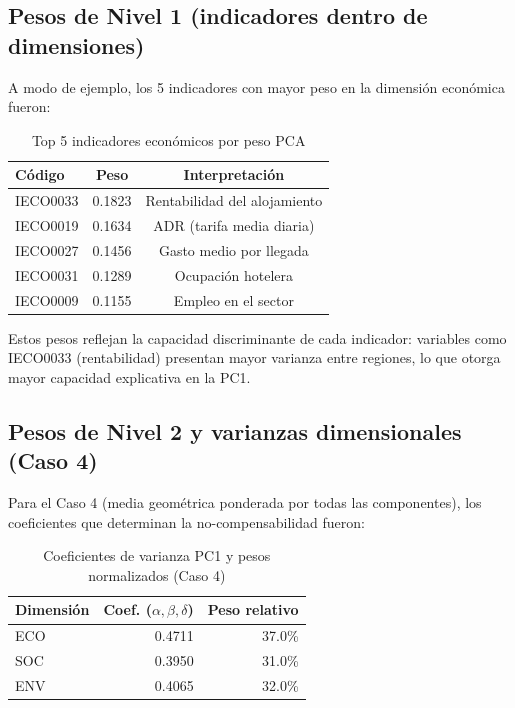 \subsection{Pesos de Nivel 1 (indicadores dentro de dimensiones)}

A modo de ejemplo, los 5 indicadores con mayor peso en la dimensión económica fueron:

\begin{table}[H]
    \centering
    \small
    \begin{tabular}{lcc}
        \toprule
        \textbf{Código} & \textbf{Peso} & \textbf{Interpretación} \\
        \midrule
        IECO0033 & 0.1823 & Rentabilidad del alojamiento \\
        IECO0019 & 0.1634 & ADR (tarifa media diaria) \\
        IECO0027 & 0.1456 & Gasto medio por llegada \\
        IECO0031 & 0.1289 & Ocupación hotelera \\
        IECO0009 & 0.1155 & Empleo en el sector \\
        \bottomrule
    \end{tabular}
    \caption{Top 5 indicadores económicos por peso PCA}
    \label{tab:pesos_eco}
\end{table}

Estos pesos reflejan la capacidad discriminante de cada indicador: variables como IECO0033 (rentabilidad) presentan mayor varianza entre regiones, lo que otorga mayor capacidad explicativa en la PC1.

\subsection{Pesos de Nivel 2 y varianzas dimensionales (Caso 4)}

Para el Caso 4 (media geométrica ponderada por todas las componentes), los coeficientes que determinan la no-compensabilidad fueron:

\begin{table}[H]
    \centering
    \small
    \begin{tabular}{lrr}
        \toprule
        \textbf{Dimensión} & \textbf{Coef. ($\alpha, \beta, \delta$)} & \textbf{Peso relativo} \\
        \midrule
        ECO & 0.4711 & 37.0\% \\
        SOC & 0.3950 & 31.0\% \\
        ENV & 0.4065 & 32.0\% \\
        \bottomrule
    \end{tabular}
    \caption{Coeficientes de varianza PC1 y pesos normalizados (Caso 4)}
    \label{tab:coef_caso4}
\end{table}

